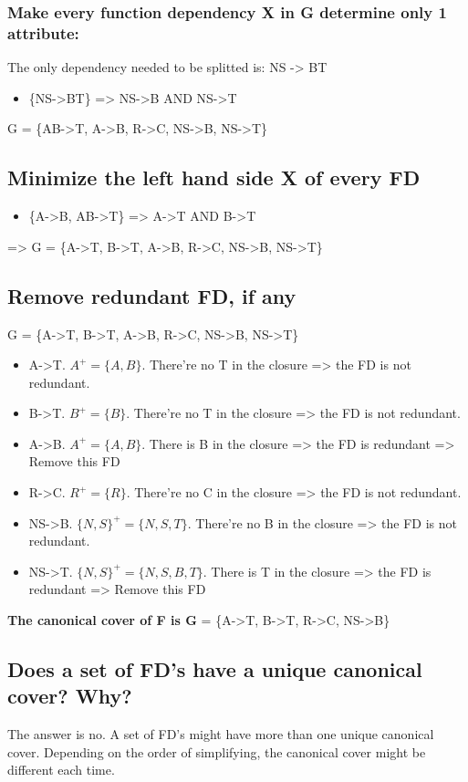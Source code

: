 \subsubsection{Make every function dependency X in G determine only 1 attribute:}
The only dependency needed to be splitted is: NS -> BT\\
\begin{itemize}
    \item \{NS->BT\} => {NS->B} AND {NS->T}
\end{itemize}

G = \{AB->T, A->B, R->C, NS->B, NS->T\}

\subsection{Minimize the left hand side X of every FD}
\begin{itemize}
    \item \{A->B, AB->T\} => A->T AND B->T
\end{itemize}
=> 
G = \{A->T, B->T, A->B, R->C, NS->B, NS->T\}

\subsection{Remove redundant FD, if any}
G = \{A->T, B->T, A->B, R->C, NS->B, NS->T\}
\begin{itemize}
    \item A->T. $A^{+} = \{ A, B\}$. There're no T in the closure => the FD is not redundant.
    \item B->T. $B^{+} = \{ B\}$. There're no T in the closure => the FD is not redundant.
    \item A->B. $A^{+} = \{ A, B\}$. There is B in the closure => the FD is redundant => Remove this FD
    \item R->C. $R^{+} = \{ R\}$. There're no C in the closure => the FD is not redundant.
    \item NS->B. $\{N,S\}^{+} = \{ N, S, T\}$. There're no B in the closure => the FD is not redundant.
    \item NS->T. $\{N,S\}^{+} = \{ N, S, B, T\}$. There is T in the closure => the FD is redundant => Remove this FD
\end{itemize}
\textbf{The canonical cover of F is G} = \{A->T, B->T, R->C, NS->B\}


\newpage
\subsection{Does a set of FD’s have a unique canonical cover? Why? }
The answer is no. A set of FD's might have more than one unique canonical cover. Depending on the order of simplifying, the canonical cover might be different each time. 
